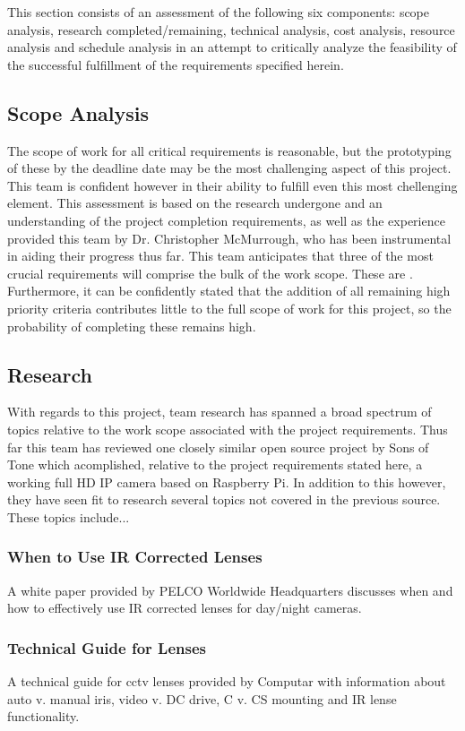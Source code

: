 This section consists of an assessment of the following six components: scope analysis, research completed/remaining, technical analysis, cost analysis, resource analysis and schedule analysis in an attempt to critically analyze the feasibility of the successful fulfillment of the requirements specified herein.
\subsection{Scope Analysis}
The scope of work for all critical requirements is reasonable, but the prototyping of these by the deadline date may be the most challenging aspect of this project. This team is confident however in their ability to fulfill even this most chellenging element. This assessment is based on the research undergone and an understanding of the project completion requirements, as well as the experience provided this team by Dr. Christopher McMurrough, who has been instrumental in aiding their progress thus far. This team anticipates that three of the most crucial requirements will comprise the bulk of the work scope. These are{ }. Furthermore, it can be confidently stated that the addition of all remaining high priority criteria contributes little to the full scope of work for this project, so the probability of completing these remains high.
\subsection{Research}
With regards to this project, team research has spanned a broad spectrum of topics relative to the work scope associated with the project requirements. Thus far this team has reviewed one closely similar open source project by Sons of Tone which acomplished, relative to the project requirements stated here, a working full HD IP camera based on Raspberry Pi. In addition to this however, they have seen fit to research several topics not covered in the previous source. These topics include...
\subsubsection{When to Use IR Corrected Lenses}
A white paper provided by PELCO Worldwide Headquarters discusses when and how to effectively use IR corrected lenses for day/night cameras.
\subsubsection{Technical Guide for Lenses}
A technical guide for cctv lenses provided by Computar with information about auto v. manual iris, video v. DC drive, C v. CS mounting and IR lense functionality.
